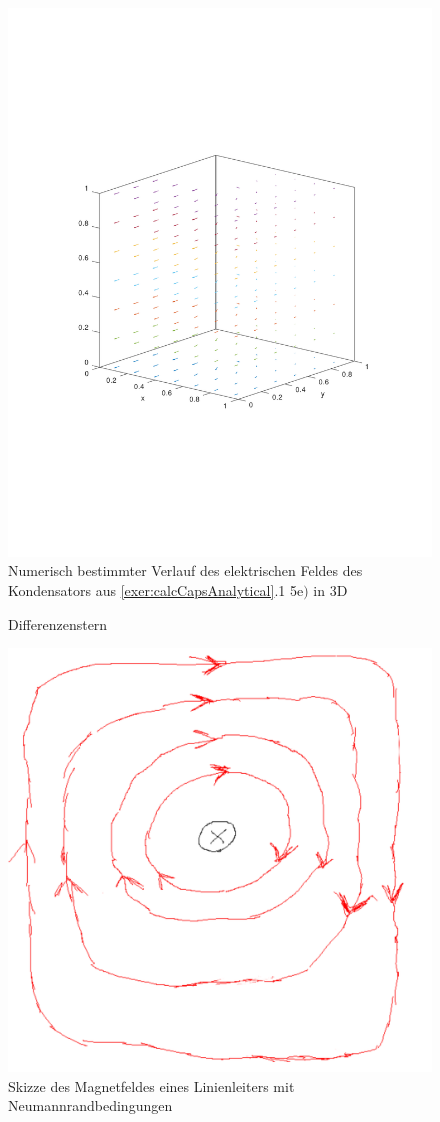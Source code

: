 \documentclass[Protokollheft.tex]{subfiles}
\begin{document}
\begin{figure}[h!]
	\centering
	\includegraphics[trim = 20mm 70mm 20mm 70mm, clip,width=0.7\linewidth]{E_3D_E.pdf}
	\caption{Numerisch bestimmter Verlauf des elektrischen Feldes des Kondensators aus \ref{exer:calcCapsAnalytical}.1 5e$)$ in 3D}
	\label{fig:C_5e_3D}
\end{figure}

\begin{figure}[ht]
	\centering
	\def\svgwidth{0.7\textwidth}
	
	\caption{Differenzenstern}
	\label{fig:diffstern}
\end{figure}

\begin{figure}
	\centering
	\includegraphics[width=0.5\linewidth]{NeumannRand}
	\caption{Skizze des Magnetfeldes eines Linienleiters mit Neumannrandbedingungen}
	\label{fig:neumannrand}
\end{figure}
\end{document}

